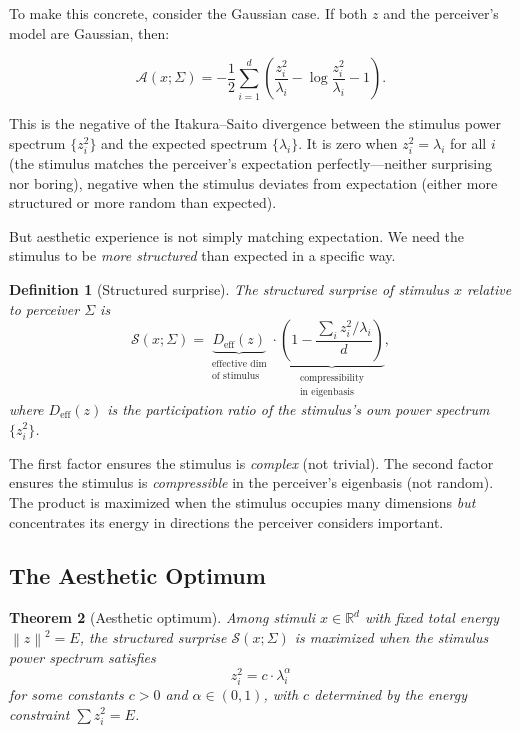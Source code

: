 \documentclass[journal]{IEEEtran}
\newtheorem{theorem}{Theorem}
\newtheorem{definition}[theorem]{Definition}
\newcommand{\R}{\mathbb{R}}
\newcommand{\norm}[1]{\left\lVert #1 \right\rVert}
\begin{document}
To make this concrete, consider the Gaussian case.  If both $z$ and the
perceiver's model are Gaussian, then:

\begin{equation}
    \mathcal{A}(x; \Sigma) = -\frac{1}{2}\sum_{i=1}^d
    \left(\frac{z_i^2}{\lambda_i} - \log \frac{z_i^2}{\lambda_i}
    - 1\right).
    \label{eq:aesthetic_gaussian}
\end{equation}

This is the negative of the Itakura--Saito divergence between the
stimulus power spectrum $\{z_i^2\}$ and the expected spectrum
$\{\lambda_i\}$.  It is zero when $z_i^2 = \lambda_i$ for all $i$
(the stimulus matches the perceiver's expectation perfectly---neither
surprising nor boring), negative when the stimulus deviates from
expectation (either more structured or more random than expected).

But aesthetic experience is not simply matching expectation.  We
need the stimulus to be \emph{more structured} than expected in a
specific way.

\begin{definition}[Structured surprise]
\label{def:surprise}
The \emph{structured surprise} of stimulus $x$ relative to perceiver
$\Sigma$ is
\begin{equation}
    \mathcal{S}(x; \Sigma) =
    \underbrace{D_{\mathrm{eff}}(z)}_{\substack{\text{effective dim}\\\text{of stimulus}}}
    \cdot
    \underbrace{\left(1 - \frac{\sum_i z_i^2 / \lambda_i}{d}\right)}_{\substack{\text{compressibility}\\\text{in eigenbasis}}},
    \label{eq:surprise}
\end{equation}
where $D_{\mathrm{eff}}(z)$ is the participation ratio of the
stimulus's own power spectrum $\{z_i^2\}$.
\end{definition}

The first factor ensures the stimulus is \emph{complex} (not trivial).
The second factor ensures the stimulus is \emph{compressible} in the
perceiver's eigenbasis (not random).  The product is maximized when the
stimulus occupies many dimensions \emph{but} concentrates its energy in
directions the perceiver considers important.

\subsection{The Aesthetic Optimum}

\begin{theorem}[Aesthetic optimum]
\label{thm:optimum}
Among stimuli $x \in \R^d$ with fixed total energy
$\norm{z}^2 = E$, the structured surprise $\mathcal{S}(x; \Sigma)$
is maximized when the stimulus power spectrum satisfies
\begin{equation}
    z_i^2 = c \cdot \lambda_i^\alpha
    \label{eq:optimum}
\end{equation}
for some constants $c > 0$ and $\alpha \in (0, 1)$, with $c$
determined by the energy constraint $\sum z_i^2 = E$.
\end{theorem}
\end{document}
